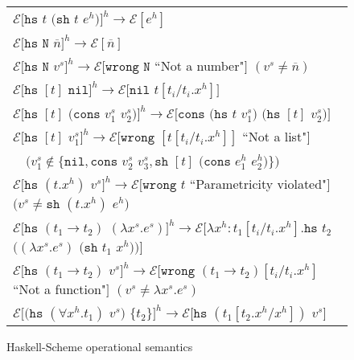 \begin{figure}[p]
\centering
\begin{tabular}{l}


$\mathscr{E}[\mathtt{hs}$ $t$ $(\mathtt{sh}$ $t$ $e^h)]^h\rightarrow\mathscr{E}[e^h]$ \\


$\mathscr{E}[\mathtt{hs}$ $\mathtt{N}$ $\overline{n}]^h\rightarrow\mathscr{E}[\overline{n}]$ \\


$\mathscr{E}[\mathtt{hs}$ $\mathtt{N}$ $v^s]^h\rightarrow\mathscr{E}[\mathtt{wrong}$ $\mathtt{N}$ ``Not a number"$]$ $(v^s\neq\overline{n})$ \\


$\mathscr{E}[\mathtt{hs}$ $[t]$ $\mathtt{nil}]^h\rightarrow\mathscr{E}[\mathtt{nil}$ $t[t_i/t_i.x^h]]$ \\


$\mathscr{E}[\mathtt{hs}$ $[t]$ $(\mathtt{cons}$ $v^s_1$ $v^s_2)]^h\rightarrow\mathscr{E}[\mathtt{cons}$ $(\mathtt{hs}$ $t$ $v^s_1)$ $(\mathtt{hs}$ $[t]$ $v^s_2)]$ \\


$\mathscr{E}[\mathtt{hs}$ $[t]$ $v^s_1]^h\rightarrow\mathscr{E}[\mathtt{wrong}$ $[t[t_i/t_i.x^h]]$ ``Not a list"$]$ \\

$\quad(v^s_1\not\in\lbrace\mathtt{nil},\mathtt{cons}$ $v^s_2$ $v^s_3,\mathtt{sh}$ $[t]$ $(\mathtt{cons}$ $e^h_1$ $e^h_2)\rbrace)$ \\


$\mathscr{E}[\mathtt{hs}$ $(t.x^h)$ $v^s]^h\rightarrow\mathscr{E}[\mathtt{wrong}$ $t$ ``Parametricity violated"$]$ $(v^s\neq \mathtt{sh}$ $(t.x^h)$ $e^h)$ \\


$\mathscr{E}[\mathtt{hs}$ $(t_1\rightarrow t_2)$ $(\lambda x^s.e^s)]^h\rightarrow\mathscr{E}[\lambda x^h:t_1[t_i/t_i.x^h].\mathtt{hs}$ $t_2$ $((\lambda x^s.e^s)$ $(\mathtt{sh}$ $t_1$ $x^h))]$ \\


$\mathscr{E}[\mathtt{hs}$ $(t_1\rightarrow t_2)$ $v^s]^h\rightarrow\mathscr{E}[\mathtt{wrong}$ $(t_1\rightarrow t_2)[t_i/t_i.x^h]$ ``Not a function"$]$ $(v^s\neq\lambda x^s.e^s)$ \\


$\mathscr{E}[(\mathtt{hs}$ $(\forall x^h.t_1)$ $v^s)$ $\lbrace t_2\rbrace]^h\rightarrow\mathscr{E}[\mathtt{hs}$ $(t_1[t_2.x^h/x^h])$ $v^s]$

\end{tabular}
\caption{Haskell-Scheme operational semantics}
\label{hsos}
\end{figure}